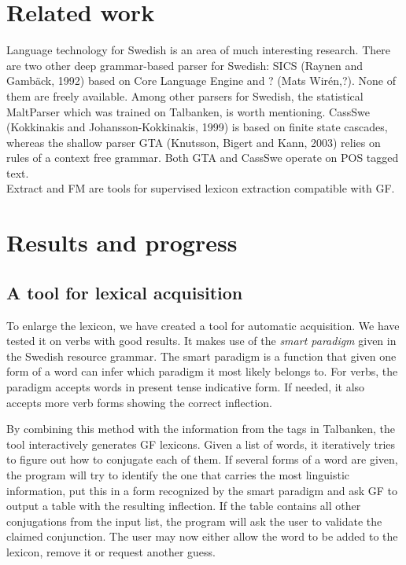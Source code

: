 \documentclass[submission]{eptcs} %
\begin{document}
\section{Related work}
Language technology for Swedish is an area of much interesting research.
There are two other deep grammar-based parser for Swedish:
SICS (Raynen and Gambäck, 1992) based on Core Language Engine and ? (Mats Wirén,?).
None of them are freely available.
Among other parsers for Swedish, the statistical MaltParser\cite{malt}
which was trained on Talbanken, is worth mentioning. 
CassSwe (Kokkinakis and Johansson-Kokkinakis, 1999) is based on finite state cascades,
whereas the shallow parser GTA (Knutsson, Bigert and Kann, 2003) relies on rules of 
a context free grammar. Both GTA and CassSwe operate on POS tagged text.\\
Extract and FM\cite{MarkusForsberg2007} are tools for supervised lexicon
extraction compatible with GF.


\section{Results and progress}
\label{sec:progress}
\subsection{A tool for lexical acquisition}
To enlarge the lexicon, 
we have created a tool for automatic acquisition. We have
tested it on verbs with good results. It makes use of
the \emph{smart paradigm} given in the Swedish resource grammar.
The smart paradigm is a function that given one form of a word can
infer which paradigm it most likely belongs to.
For verbs, the paradigm accepts words in present tense indicative form.
If needed, it also accepts more verb forms showing the correct inflection.

By combining this method with the information from the tags in Talbanken,
the tool interactively generates GF lexicons. 
Given a list of words, it iteratively
tries to figure out how to conjugate each of them. If several forms of a word are 
given, the program will try to identify the one that carries the most linguistic
information, put this in a form recognized by the smart paradigm and ask GF to output
a table with the resulting inflection. 
If the table contains all other conjugations from the input list,
the program will ask the  user to
validate the claimed conjunction. The user may now either
allow the word to be added to the lexicon, remove it or request another guess.
\end{document}
